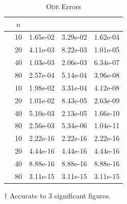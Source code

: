 \documentclass[a4paper,12pt,twocolumn]{article}
\begin{document}
\begin{table}[h]
    \centering
    \footnotesize
    \caption{\textsc{Ode} Errors}
    \label{table:err}
    \begin{threeparttable}
        \begin{tabular}{
            @{}
            l
            S[table-format=2]
            S[table-format=1.2e+2]
            S[table-format=1.2e+2]
            S[table-format=1.2e+2]
            @{}
        }
            \toprule
            & {$n$}
            & {\bf{}}
            & {\bf{}}
            & {\bf{}}\\
            \midrule
            & 10 & 1.65e-02 & 3.29e-02 & 1.62e-04 \\
            & 20 & 4.11e-03 & 8.22e-03 & 1.01e-05 \\
            & 40 & 1.03e-03 & 2.06e-03 & 6.34e-07 \\
            & 80 & 2.57e-04 & 5.14e-04 & 3.96e-08 \\
            \midrule
            & 10 & 1.98e-02 & 3.31e-04 & 4.12e-08 \\ 
            & 20 & 1.01e-02 & 8.43e-05 & 2.63e-09 \\ 
            & 40 & 5.10e-03 & 2.13e-05 & 1.66e-10 \\ 
            & 80 & 2.56e-03 & 5.34e-06 & 1.04e-11 \\ 
            \midrule
            & 10 & 2.22e-16 & 2.22e-16 & 2.22e-16 \\ 
            & 20 & 4.44e-16 & 4.44e-16 & 4.44e-16 \\ 
            & 40 & 8.88e-16 & 8.88e-16 & 8.88e-16 \\ 
            & 80 & 3.11e-15 & 3.11e-15 & 3.11e-15 \\ 
            \bottomrule
        \end{tabular}
        \begin{tablenotes}
            \item[$\dagger$] Accurate to 3 significant figures.
        \end{tablenotes}
    \end{threeparttable}
\end{table}
\end{document}
